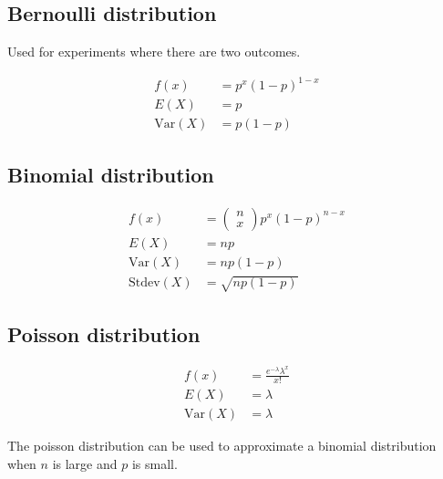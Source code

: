 \documentclass{article}
\newcommand{\var}{\text{Var}}
\begin{document}
\begin{multicols*}{2}
\subsection{Bernoulli distribution}

Used for experiments where there are two outcomes.

\begin{align*}
    f(x) &= p^x (1-p)^{1-x} \\
    E(X) &= p \\
    \var(X) &= p(1-p)
\end{align*}

\subsection{Binomial distribution}

\begin{align*}
    f(x) &= \begin{pmatrix}
        n \\
        x
    \end{pmatrix} p^x (1-p)^{n-x} \\
    E(X) &= np \\
    \var(X) &= np(1-p) \\
    \text{Stdev}(X) &= \sqrt{np(1-p)}
\end{align*}

\subsection{Poisson distribution}

\begin{align*}
    f(x) &= \frac{e^{-\lambda} \lambda^x}{x!} \\
    E(X) &= \lambda \\
    \var(X) &= \lambda
\end{align*}

The poisson distribution can be used to approximate a binomial distribution when $n$ is large and $p$ is small.

\end{multicols*}
\end{document}
